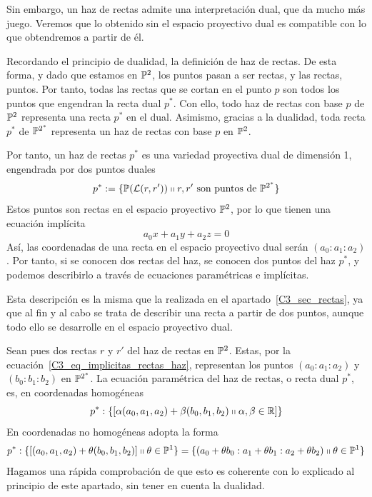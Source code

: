 Sin embargo, un haz de rectas admite una interpretación dual, que da mucho más juego. Veremos que lo obtenido sin el espacio proyectivo dual es compatible con lo que obtendremos a partir de él.

Recordando el principio de dualidad,  la definición de haz de rectas. De esta forma, y dado que estamos en $\mathbb{P}^2$, los puntos pasan a ser rectas, y las rectas, puntos. Por tanto, todas las rectas que se cortan en el punto $p$ son todos los puntos que engendran la recta dual $p^*$. Con ello, todo haz de rectas con base $p$ de $\mathbb{P}^2$ representa una recta $p^*$ en el dual. Asimismo, gracias a la dualidad, toda recta $p^*$ de $\mathbb{P}^{2^*}$ representa un haz de rectas con base $p$ en $\mathbb{P}^2$.

Por tanto, un haz de rectas $p^*$ es una variedad proyectiva dual de dimensión 1, engendrada por dos puntos duales
\begin{equation}
	p^*:=\{\mathbb{P}(\mathcal{L}(r,r'))\shortparallel r,r'\text{ son puntos de }\mathbb{P}^{2^*}\}
\end{equation}
Estos puntos son rectas en el espacio proyectivo $\mathbb{P}^2$, por lo que tienen una ecuación implícita
\begin{equation*}
	a_0x+a_1y+a_2z=0
\end{equation*}
Así, las coordenadas de una recta en el espacio proyectivo dual serán $(a_0:a_1:a_2)$. Por tanto, si se conocen dos rectas del haz, se conocen dos puntos del haz $p^*$, y podemos describirlo a través de ecuaciones paramétricas e implícitas. 

Esta descripción es la misma que la realizada en el apartado~\ref{C3_sec_rectas}, ya que al fin y al cabo se trata de describir una recta a partir de dos puntos, aunque todo ello se desarrolle en el espacio proyectivo dual. 

Sean pues dos rectas $r$ y $r'$ del haz de rectas en $\mathbb{P}^2$. Estas, por la ecuación~\eqref{C3_eq_implicitas_rectas_haz}, representan los puntos $(a_0:a_1:a_2)$ y $(b_0:b_1:b_2)$ en $\mathbb{P}^{2^*}$. La ecuación paramétrica del haz de rectas, o recta dual $p^*$, es, en coordenadas homogéneas
\begin{equation}
	p^*:\{\left [ \alpha (a_0,a_1,a_2)+\beta (b_0,b_1,b_2)\shortparallel \alpha,\beta\in\mathbb{R} \right ]\}
\end{equation}
En coordenadas no homogéneas adopta la forma
\begin{equation}
p^*:\{\left [ (a_0,a_1,a_2)+\theta (b_0,b_1,b_2) \right ]\shortparallel \theta\in\mathbb{P}^1\}=\{(a_0+\theta b_0:a_1+\theta b_1:a_2+\theta b_2)\shortparallel \theta\in\mathbb{P}^1\}
\end{equation}
Hagamos una rápida comprobación de que esto es coherente con lo explicado al principio de este apartado, sin tener en cuenta la dualidad. 

